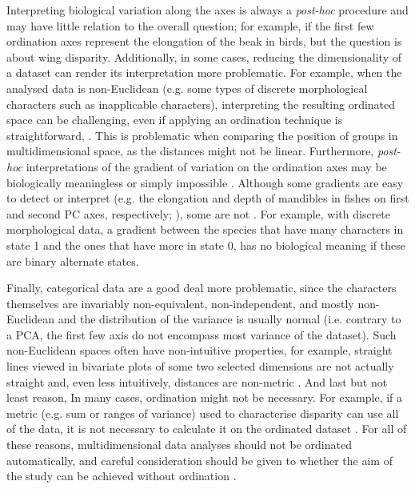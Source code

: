 \documentclass[12pt,letterpaper]{article}
\begin{document}
Interpreting biological variation along the axes is always a \textit{post-hoc} procedure and may have little relation to the overall question; for example, if the first few ordination axes represent the elongation of the beak in birds, but the question is about wing disparity.
Additionally, in some cases, reducing the dimensionality of a dataset can render its interpretation more problematic.
For example, when the analysed data is non-Euclidean (e.g. some types of discrete morphological characters such as inapplicable characters), interpreting the resulting ordinated space can be challenging, even if applying an ordination technique is straightforward, \citep{Gerber2019}.
This is problematic when comparing the position of groups in multidimensional space, as the distances might not be linear.
Furthermore, \textit{post-hoc} interpretations of the gradient of variation on the ordination axes may be biologically meaningless or simply impossible \citep{Gerber2019}.
Although some gradients are easy to detect or interpret (e.g. the elongation and depth of mandibles in fishes on first and second PC axes, respectively; \citealt{Hill2018-ye}), some are not \citep[e.g.][]{Weisbecker2019-kp}.
For example, with discrete morphological data, a gradient between the species that have many characters in state 1 and the ones that have more in state 0, has no biological meaning if these are binary alternate states.

Finally, categorical data are a good deal more problematic, since the characters themselves are invariably non-equivalent, non-independent, and mostly non-Euclidean and the distribution of the variance is usually normal (i.e. contrary to a PCA, the first few axis do not encompass most variance of the dataset).
Such non-Euclidean spaces often have non-intuitive properties, for example, straight lines viewed in bivariate plots of some two selected dimensions are not actually straight and, even less intuitively, distances are non-metric \citep[i.e. the distance between A and B is not equal to the distance between B and A][]{Gerber2014-ol}.
And last but not least reason, In many cases, ordination might not be necessary.
For example, if a metric (e.g. sum or ranges of variance) used to characterise disparity can use all of the data, it is not necessary to calculate it on the ordinated dataset \citep{Close2015-qi}.
For all of these reasons, multidimensional data analyses should not be ordinated automatically, and careful consideration should be given to whether the aim of the study can be achieved without ordination \citep{lloyd2016,lloyd2018}.
\end{document}
